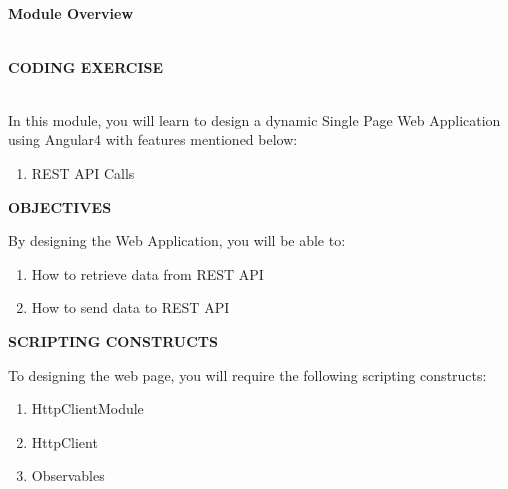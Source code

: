 \documentclass{article}
\begin{document}
\begin{center}

\noindent \\ {\huge \textbf{}}
\end{center}

\noindent \\ \textbf{\underbar{}}

\noindent \\ \\ {\Large \textbf{Module Overview}}

\noindent \underbar{}

\noindent \\  \textbf{CODING EXERCISE}

\noindent \textbf{}

\noindent \\ In this module, you will learn to design a dynamic Single Page Web Application using Angular4 with features mentioned below:

\begin{enumerate}
	\item REST API Calls    
\end{enumerate}
  

\noindent 

\noindent \textbf{OBJECTIVES}

\noindent 

\noindent By designing the Web Application, you will be able to: 

\begin{enumerate}
	\item How to retrieve data from REST API
	\item How to send data to REST API 
\end{enumerate}
     

\noindent 

\noindent \textbf{SCRIPTING CONSTRUCTS}

\noindent 

\noindent To designing the web page, you will require the following scripting constructs: 

\begin{enumerate}
	\item HttpClientModule
	\item HttpClient
	\item Observables
\end{enumerate}
     
\newpage
{}
\end{document}
